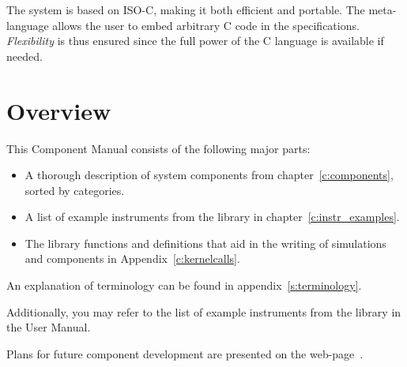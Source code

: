 The \MCS system is based on ISO-C, making it both efficient and
portable. The meta-language allows the user to embed arbitrary C code in
the specifications. \textit{Flexibility} is thus ensured since the full
power of the C language is available if needed.


\section{Overview}

This \MCS Component Manual consists of the following major parts:
\begin{itemize}
\item A thorough description of system components 
from chapter~\ref{c:components}, sorted by categories. 
\item A list of example instruments from the library in chapter~\ref{c:instr_examples}. 
\item The \MCS library functions and definitions
  that aid in the writing of simulations and components in
  Appendix~\ref{c:kernelcalls}.    
\end{itemize}
An explanation of \MCS terminology can be
found in appendix~\ref{s:terminology}.

Additionally, you may refer to the list of example instruments from the library in the \MCS User Manual.

Plans for future component development are presented 
on the \MCS web-page~\cite{mcstas_webpage}.




